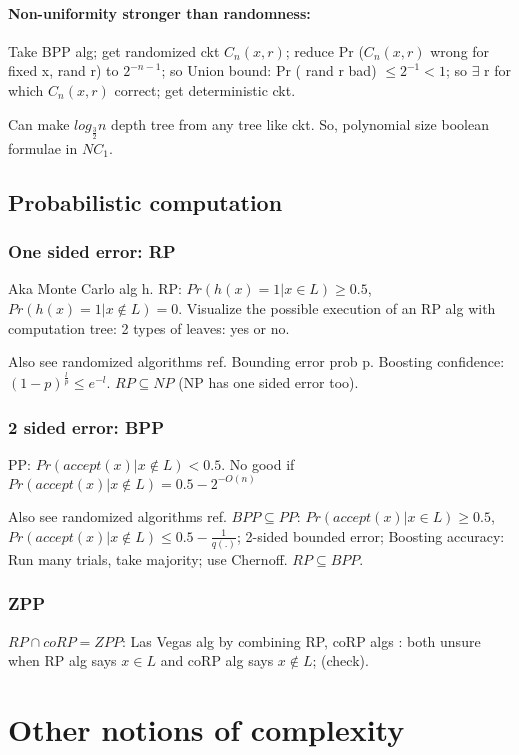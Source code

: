 \documentclass[oneside, article]{memoir}
\begin{document}
\subsubsection{Non-uniformity stronger than randomness: }
Take BPP alg; get randomized ckt $C_{n}(x, r)$; reduce Pr ($C_{n}(x, r)$ wrong for fixed x, rand r) to $2^{-n-1}$; so Union bound: Pr ( rand r bad) $\leq 2^{-1} < 1$; so $\exists$ r for which $C_{n}(x, r)$ correct; get deterministic ckt.

Can make $log_{\frac{3}{2}}n$ depth tree from any tree like ckt. So, polynomial size boolean formulae in $NC_{1}$.

\section{Probabilistic computation}
\subsection{One sided error: RP}
Aka Monte Carlo alg h. RP: $Pr(h(x)=1|x \in L)\geq 0.5$, $Pr(h(x)=1|x \notin L) = 0$. Visualize the possible execution of an RP alg with computation tree: 2 types of leaves: yes or no.

Also see randomized algorithms ref. Bounding error prob p. Boosting confidence: $(1-p)^{\frac{l}{p}} \leq e^{-l}$. $RP \subseteq NP$ (NP has one sided error too).

\subsection{2 sided error: BPP}
PP: $Pr(accept(x)|x \notin L)< 0.5$. No good if $Pr(accept(x)|x \notin L) = 0.5 - 2^{-O(n)}$

Also see randomized algorithms ref. $BPP \subseteq PP$: $Pr(accept(x)|x \in L)\geq 0.5$, $Pr(accept(x)|x \notin L)\leq 0.5 - \frac{1}{q(.)}$; 2-sided bounded error; Boosting accuracy: Run many trials, take majority; use Chernoff. $RP \subseteq BPP$.

\subsection{ZPP}
$RP \cap coRP = ZPP$: Las Vegas alg by combining RP, coRP algs : both unsure when RP alg says $x \in L$ and coRP alg says $x \notin L$; (check).

\chapter{Other notions of complexity}
\end{document}
